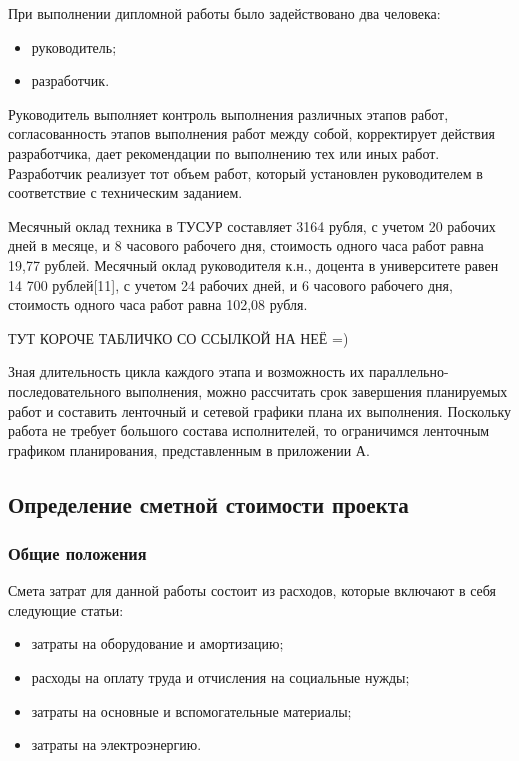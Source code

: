 При выполнении дипломной работы было задействовано два человека:

\begin{itemize}
 \item руководитель;
 \item разработчик.
\end{itemize}

Руководитель выполняет контроль выполнения различных этапов работ, согласованность этапов выполнения работ между собой, корректирует действия разработчика, дает рекомендации по выполнению тех или иных работ. Разработчик реализует тот объем работ, который установлен руководителем в соответствие с техническим заданием.

Месячный оклад техника в ТУСУР составляет 3164 рубля, с учетом 20 рабочих дней в месяце, и 8 часового рабочего дня, стоимость одного часа работ равна 19,77 рублей. Месячный оклад руководителя к.н., доцента в университете равен 14 700 рублей[11], с учетом 24 рабочих дней, и 6 часового рабочего дня, стоимость одного часа работ равна 102,08 рубля.

ТУТ КОРОЧЕ ТАБЛИЧКО СО ССЫЛКОЙ НА НЕЁ =) %

Зная длительность цикла каждого этапа и возможность их параллельно-последовательного выполнения, можно рассчитать срок завершения планируемых работ и составить ленточный и сетевой графики плана их выполнения. Поскольку работа не требует большого состава исполнителей, то ограничимся ленточным графиком планирования, представленным в приложении А.

\subsection{Определение сметной стоимости проекта}

\subsubsection{Общие положения}

Смета затрат для данной работы состоит из расходов, которые включают в себя следующие статьи:

\begin{itemize}
 \item затраты на оборудование и амортизацию;
 \item расходы на оплату труда и отчисления на социальные нужды;
 \item затраты на основные и вспомогательные материалы;
 \item затраты на электроэнергию.
\end{itemize}

